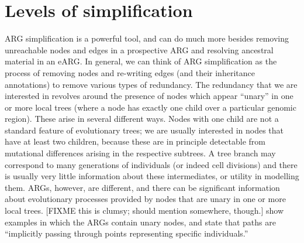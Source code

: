 \documentclass{article}
\begin{document}
\section*{Levels of simplification}\label{ARG_simplification}
ARG simplification is a powerful tool, and can do much more
besides removing unreachable nodes and edges in a prospective ARG
and resolving ancestral material in an eARG.
In general, we can think of
ARG simplification as the process
of removing nodes and re-writing edges (and their inheritance annotations)
to remove various types of redundancy.
The redundancy that we are interested in
revolves around the presence of nodes which appear
``unary'' in one or more local trees
(where a node has exactly one child over a particular genomic region).
These arise in several different ways.
Nodes with one child are not a standard feature of evolutionary trees;
we are usually interested in
nodes that have at least two children, because these
are in principle detectable from mutational differences
arising in the respective subtrees.
A tree branch may correspond to many generations
of individuals (or indeed cell divisions) and there is usually
very little information about these intermediates, or utility
in modelling them.
ARGs, however, are different, and there
can be significant information about evolutionary processes
provided by nodes that are unary in one or more local trees.
[FIXME this is clumsy; should mention somewhere, though.]
\citet{mathieson2020ancestry} show examples in which the ARGs
contain unary nodes, and state that paths are ``implicitly passing through points representing specific
individuals.''
\end{document}
